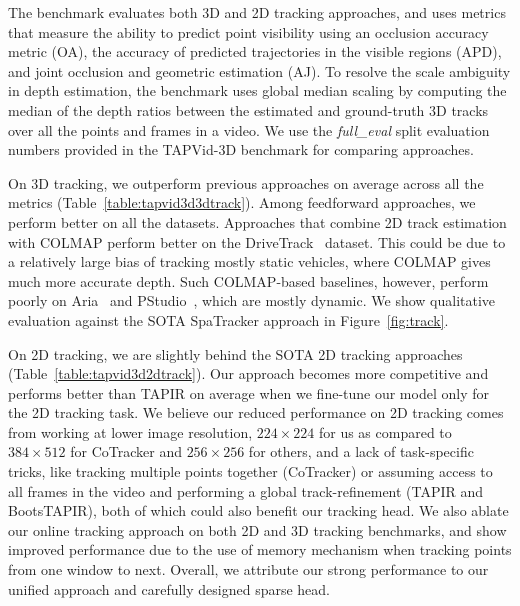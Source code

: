 The benchmark evaluates both 3D and 2D tracking approaches, and uses metrics that measure the ability to predict point visibility using an occlusion accuracy metric (OA), the accuracy of predicted trajectories in the visible regions (APD), and joint occlusion and geometric estimation (AJ).
To resolve the scale ambiguity in depth estimation, the benchmark uses global median scaling by computing the median of the depth ratios between the estimated and ground-truth 3D tracks over all the points and frames in a video.
We use the \textit{full\_eval} split evaluation numbers provided in the TAPVid-3D benchmark for comparing approaches.

On 3D tracking, we outperform previous approaches on average across all the metrics (Table~\ref{table:tapvid3d3dtrack}).
Among feedforward approaches, we perform better on all the datasets.
Approaches that combine 2D track estimation with COLMAP perform better on the DriveTrack~\cite{sun2020waymodataset} dataset.
This could be due to a relatively large bias of tracking mostly static vehicles, where COLMAP gives much more accurate depth.
Such COLMAP-based baselines, however, perform poorly on Aria~\cite{pan2023aria} and PStudio~\cite{joo2015pstudio}, which are mostly dynamic.
We show qualitative evaluation against the SOTA SpaTracker approach in Figure~\ref{fig:track}.

On 2D tracking, we are slightly behind the SOTA 2D tracking approaches (Table~\ref{table:tapvid3d2dtrack}).
Our approach becomes more competitive and performs better than TAPIR on average when we fine-tune our model only for the 2D tracking task.
We believe our reduced performance on 2D tracking comes from working at lower image resolution, $224\times224$ for us as compared to $384\times512$ for CoTracker and $256\times256$ for others, and a lack of task-specific tricks, like tracking multiple points together (CoTracker) or assuming access to all frames in the video and performing a global track-refinement (TAPIR and BootsTAPIR), both of which could also benefit our tracking head.
We also ablate our online tracking approach on both 2D and 3D tracking benchmarks, and show improved performance due to the use of memory mechanism when tracking points from one window to next.
Overall, we attribute our strong performance to our unified approach and carefully designed sparse head.



